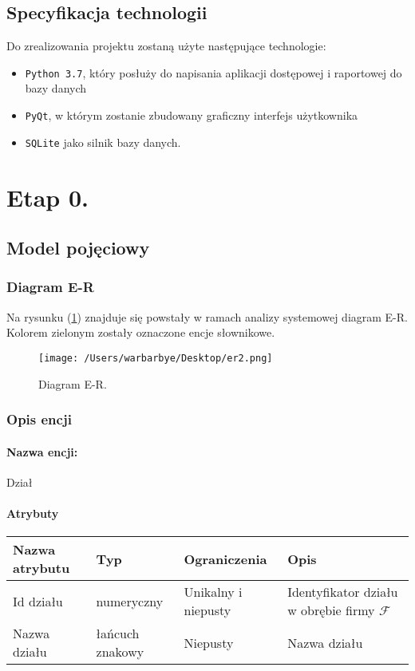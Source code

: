 \documentclass{article}
\begin{document}
\subsection{Specyfikacja technologii}
	Do zrealizowania projektu zostaną użyte następujące technologie:
		\begin{itemize}
			\item \texttt{Python 3.7}, który posłuży do napisania aplikacji dostępowej i raportowej do bazy danych
			\item \texttt{PyQt}, w którym zostanie zbudowany graficzny interfejs użytkownika
			\item \texttt{SQLite} jako silnik bazy danych.
		\end{itemize}
\newpage
\section{Etap 0. \label{s0}}
\subsection{Model pojęciowy}
\subsubsection{Diagram E-R}
Na rysunku (\ref{er1}) znajduje się powstały w ramach analizy systemowej diagram E-R. Kolorem zielonym zostały oznaczone encje słownikowe.
\begin{figure}[H]
			\centering
			\texttt{[image: /Users/warbarbye/Desktop/er2.png]}
			\label{er1}
			\caption{Diagram E-R.}
\end{figure}
\subsubsection{Opis encji}
\paragraph{Nazwa encji:\\ }
Dział
\paragraph{Atrybuty\\ }
\begin{table}[H]
\begin{tabular}{|l|l|l|l|}
\hline
\textbf{Nazwa atrybutu} & \textbf{Typ}    & \textbf{Ograniczenia} & \textbf{Opis}                                      \\ \hline
Id działu               & numeryczny      & Unikalny i niepusty   & Identyfikator działu w obrębie firmy $\mathcal{F}$ \\ \hline
Nazwa działu            & łańcuch znakowy & Niepusty              & Nazwa działu                                       \\ \hline
\end{tabular}
\end{table}
\end{document}
